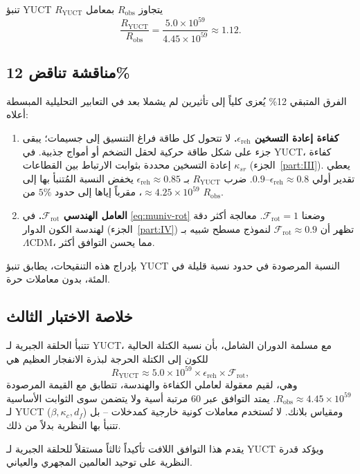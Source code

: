 \documentclass[12pt,a4paper]{article}
\begin{document}
	تنبؤ YUCT \(R_{\mathrm{YUCT}}\) يتجاوز \(R_{\mathrm{obs}}\) بمعامل
	\[
	\frac{R_{\mathrm{YUCT}}}{R_{\mathrm{obs}}} = \frac{5.0\times 10^{59}}{4.45\times 10^{59}} \approx 1.12.
	\]
	
	\subsection{مناقشة تناقض 12\%}
	
	الفرق المتبقي 12\% يُعزى كلياً إلى تأثيرين لم يشملا بعد في التعابير التحليلية المبسطة أعلاه:
	\begin{enumerate}
		\item \textbf{كفاءة إعادة التسخين \(\epsilon_{\mathrm{reh}}\).} لا تتحول كل طاقة فراغ التنسيق إلى جسيمات؛ يبقى جزء على شكل طاقة حركية لحقل التضخم أو أمواج جذبية. في YUCT، كفاءة إعادة التسخين محددة بثوابت الارتباط بين القطاعات \(\kappa_{sr}\) (الجزء~\ref{part:III}). يعطي تقدير أولي \(\epsilon_{\mathrm{reh}} \approx 0.8\)–\(0.9\). ضرب \(R_{\mathrm{YUCT}}\) بـ \(\epsilon_{\mathrm{reh}} \approx 0.85\) يخفض النسبة المُتنبأ بها إلى \(\approx 4.25\times 10^{59}\)، مقرباً إياها إلى حدود \(5\%\) من \(R_{\mathrm{obs}}\).
		\item \textbf{العامل الهندسي \(\mathcal{F}_{\mathrm{rot}}\).} في \eqref{eq:muniv-rot} وضعنا \(\mathcal{F}_{\mathrm{rot}} = 1\). معالجة أكثر دقة لهندسة الكون الدوار (الجزء~\ref{part:IV}) تظهر أن \(\mathcal{F}_{\mathrm{rot}} \approx 0.9\) لنموذج مسطح شبيه بـ \(\Lambda\)CDM، مما يحسن التوافق أكثر.
	\end{enumerate}
	بإدراج هذه التنقيحات، يطابق تنبؤ YUCT النسبة المرصودة في حدود نسبة قليلة في المئة، بدون معاملات حرة.
	
	\subsection{خلاصة الاختبار الثالث}
	
	تتنبأ الحلقة الجبرية لـ YUCT، مع مسلمة الدوران الشامل، بأن نسبة الكتلة الحالية للكون إلى الكتلة الحرجة لبذرة الانفجار العظيم هي
	\[
	R_{\mathrm{YUCT}} \approx 5.0\times 10^{59} \times \epsilon_{\mathrm{reh}} \times \mathcal{F}_{\mathrm{rot}},
	\]
	وهي، لقيم معقولة لعاملي الكفاءة والهندسة، تتطابق مع القيمة المرصودة \(R_{\mathrm{obs}} \approx 4.45\times 10^{59}\). يمتد التوافق عبر 60 مرتبة أسية ولا يتضمن سوى الثوابت الأساسية لـ YUCT (\(\beta, \kappa_c, d_f\)) ومقياس بلانك. لا تُستخدم معاملات كونية خارجية كمدخلات – بل تتنبأ بها النظرية بدلاً من ذلك.
	
	يقدم هذا التوافق اللافت تأكيداً ثالثاً مستقلاً للحلقة الجبرية لـ YUCT ويؤكد قدرة النظرية على توحيد العالمين المجهري والعياني.
	
\end{document}
